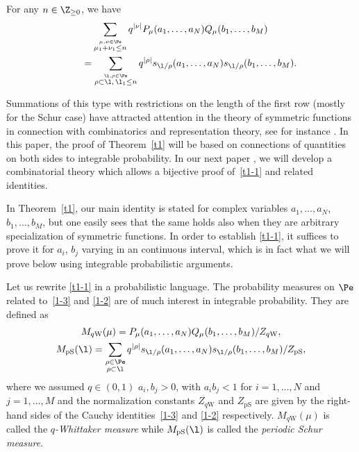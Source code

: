  \begin{Theorem} \label{t1}
 For any $n\in\Z_{\ge 0}$, we have
 \begin{gather}
 \sum_{\stackrel{\mu,\nu\in\Pe}{\mu_1+\nu_1\le n}}q^{|\nu|}P_{\mu}(a_1,\dots,a_N)
 Q_{\mu}(b_1,\dots,b_M)\nonumber\\
 \qquad=
 \sum_{\stackrel{\l,\rho\in\Pe}{\rho\subset\l,\,\l_1\le n}}
 q^{|\rho|}s_{\l/\rho}(a_1,\dots,a_N)s_{\l/\rho}(b_1,\dots,b_M). \label{t1-1}
 \end{gather}
 \end{Theorem}
 Summations of this type with restrictions on the length of the first row (mostly for the Schur case) have attracted attention in the theory of symmetric functions in connection with combinatorics and representation theory, see for instance \cite{Baik-Rains2001algebraic,Gessel1990Cauchysum,Rains1998IncreasingSubsequence,Rains-Warnaar2015boundedLittlewoodidentities}.
 In this paper, the proof of Theorem~\ref{t1} will be based on connections of quantities on both sides to integrable probability. In our next paper \cite{ImamuraMucciconiSasamoto2021skewRSK}, we will develop a combinatorial theory which allows a bijective proof of~\eqref{t1-1} and related identities.

 \begin{Remark} \label{rem:intro}
 In Theorem~\ref{t1}, our main identity is stated for complex variables $a_1,\dots,a_N$, $b_1,\dots,b_M$, but one easily sees that the same holds also when they are arbitrary specialization of symmetric functions. In order to establish \eqref{t1-1}, it suffices to prove it for $a_i$, $b_j$ varying in an continuous interval, which is in fact what we will prove below using integrable probabilistic arguments.
 \end{Remark}

 Let us rewrite \eqref{t1-1} in a probabilistic language. The probability measures on $\Pe$ related to~\eqref{1-3} and \eqref{1-2} are of much interest in integrable probability.
 They are defined as
 \begin{gather}
 M_{q\text{W}}(\mu)=P_{\mu}(a_1,\dots,a_N)Q_{\mu}(b_1,\dots,b_M)/Z_{q\text{W}}, \label{s13}
 \\
 M_{\text{pS}}(\l)=
 \sum_{\substack{\rho\in\Pe\\ \rho \subset\l }}q^{|\rho|}s_{\l/\rho}(a_1,\dots,a_N)s_{\l/\rho}(b_1,\dots,b_M)/Z_{\text{pS}}, \label{1-8}
 \end{gather}
 where we assumed $q \in (0,1)$ $a_i,b_j>0$, with $a_ib_j<1$ for $i=1,\dots,N$ and $j=1,\dots,M$ and the normalization constants $Z_{q\text{W}}$ and $Z_{\text{pS}}$ are given by the right-hand sides of the Cauchy identities~\eqref{1-3} and \eqref{1-2} respectively.
 $M_{q\text{W}}(\mu)$ is called the \emph{$q$-Whittaker measure}
 while $M_{\text{pS}}(\l)$ is called the \emph{periodic Schur measure}.


